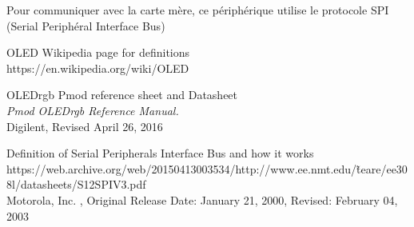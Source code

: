 \documentclass[11pt]{article}
\begin{document}
Pour communiquer avec la carte mère, ce périphérique utilise le protocole SPI (Serial Periphéral Interface Bus)



\clearpage
\begin{thebibliography}{9}
OLED Wikipedia page for definitions\\
https://en.wikipedia.org/wiki/OLED

OLEDrgb Pmod reference sheet and Datasheet\\
\textit{Pmod OLEDrgb Reference Manual.} \\
Digilent, Revised April 26, 2016

Definition of Serial Peripherals Interface Bus and how it works\\
https://web.archive.org/web/20150413003534/http://www.ee.nmt.edu/\~teare/ee308l/datasheets/S12SPIV3.pdf\\
Motorola, Inc. , Original Release Date: January 21, 2000, Revised: February 04, 2003
\end{thebibliography}
\end{document}
